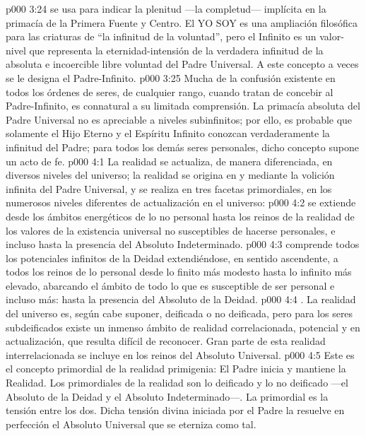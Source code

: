 \vs p000 3:24 \pc {} se usa para indicar la plenitud ---la completud--- implícita en la primacía de la Primera Fuente y Centro. El YO SOY  es una ampliación filosófica para las criaturas de “la infinitud de la voluntad”, pero el Infinito es un valor\hyp{}nivel  que representa la eternidad\hyp{}intensión de la verdadera infinitud de la absoluta e incoercible libre voluntad del Padre Universal. A este concepto a veces se le designa el Padre\hyp{}Infinito.
\vs p000 3:25 Mucha de la confusión existente en todos los órdenes de seres, de cualquier rango, cuando tratan de concebir al Padre\hyp{}Infinito, es connatural a su limitada comprensión. La primacía absoluta del Padre Universal no es apreciable a niveles subinfinitos; por ello, es probable que solamente el Hijo Eterno y el Espíritu Infinito conozcan verdaderamente la infinitud del Padre; para todos los demás seres personales, dicho concepto supone un acto de fe.
\vs p000 4:1 La realidad se actualiza, de manera diferenciada, en diversos niveles del universo; la realidad se origina en y mediante la volición infinita del Padre Universal, y se realiza en tres facetas primordiales, en los numerosos niveles diferentes de actualización en el universo:
\vs p000 4:2  se extiende desde los ámbitos energéticos de lo no personal hasta los reinos de la realidad de los valores de la existencia universal no susceptibles de hacerse personales, e incluso hasta la presencia del Absoluto Indeterminado.
\vs p000 4:3  comprende todos los potenciales infinitos de la Deidad extendiéndose, en sentido ascendente, a todos los reinos de lo personal desde lo finito más modesto hasta lo infinito más elevado, abarcando el ámbito de todo lo que es susceptible de ser personal e incluso más: hasta la presencia del Absoluto de la Deidad.
\vs p000 4:4 . La realidad del universo es, según cabe suponer, deificada o no deificada, pero para los seres subdeificados existe un inmenso ámbito de realidad correlacionada, potencial y en actualización, que resulta difícil de reconocer. Gran parte de esta realidad interrelacionada se incluye en los reinos del Absoluto Universal.
\vs p000 4:5 Este es el concepto primordial de la realidad primigenia: El Padre inicia y mantiene la Realidad. Los  primordiales de la realidad son lo deificado y lo no deificado ---el Absoluto de la Deidad y el Absoluto Indeterminado---. La  primordial es la tensión entre los dos. Dicha tensión divina iniciada por el Padre la resuelve en perfección el Absoluto Universal que se eterniza como tal.
